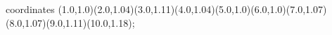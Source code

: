 					coordinates { (1.0,1.0)(2.0,1.04)(3.0,1.11)(4.0,1.04)(5.0,1.0)(6.0,1.0)(7.0,1.07)(8.0,1.07)(9.0,1.11)(10.0,1.18)};